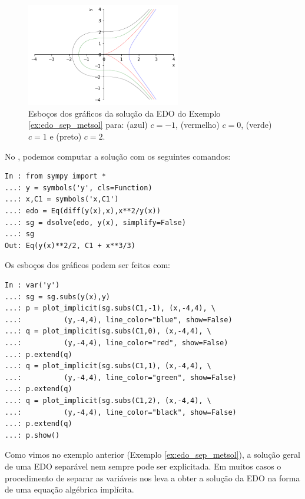 \begin{ex}
\begin{figure}[H]
  \centering
  \includegraphics[width=0.6\textwidth]{cap_edo1ordem/dados/fig_ex_edo_sep_metsol/fig_ex_edo_sep_metsol}
  \caption{Esboços dos gráficos da solução da EDO do Exemplo \ref{ex:edo_sep_metsol} para: (azul) $c=-1$, (vermelho) $c=0$, (verde) $c=1$ e (preto) $c=2$.}
  \label{fig:ex_edo_sep_metsol}
\end{figure}

\ifispython
No \python, podemos computar a solução com os seguintes comandos:
\begin{verbatim}
In : from sympy import *
...: y = symbols('y', cls=Function)
...: x,C1 = symbols('x,C1')
...: edo = Eq(diff(y(x),x),x**2/y(x))
...: sg = dsolve(edo, y(x), simplify=False)
...: sg
Out: Eq(y(x)**2/2, C1 + x**3/3)
\end{verbatim}
Os esboços dos gráficos podem ser feitos com:
\begin{verbatim}
In : var('y')
...: sg = sg.subs(y(x),y)
...: p = plot_implicit(sg.subs(C1,-1), (x,-4,4), \
...:          (y,-4,4), line_color="blue", show=False)
...: q = plot_implicit(sg.subs(C1,0), (x,-4,4), \
...:          (y,-4,4), line_color="red", show=False)
...: p.extend(q)
...: q = plot_implicit(sg.subs(C1,1), (x,-4,4), \
...:          (y,-4,4), line_color="green", show=False)
...: p.extend(q)
...: q = plot_implicit(sg.subs(C1,2), (x,-4,4), \
...:          (y,-4,4), line_color="black", show=False)
...: p.extend(q)
...: p.show()
\end{verbatim}
\fi

\end{ex}

\begin{obs}
  Como vimos no exemplo anterior (Exemplo \ref{ex:edo_sep_metsol}), a solução geral de uma EDO separável nem sempre pode ser explicitada. Em muitos casos o procedimento de separar as variáveis nos leva a obter a solução da EDO na forma de uma equação algébrica implícita.
\end{obs}

